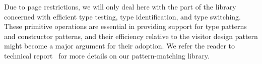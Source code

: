 Due to page restrictions, we will only deal here with the part of the library 
concerned with efficient type testing, type identification, and type switching. 
These primitive operations are essential in providing support for type patterns 
and constructor patterns, and their efficiency relative to the visitor design 
pattern might become a major argument for their adoption. We refer the reader to 
technical report~\cite{TR} for more details on our pattern-matching 
library.

